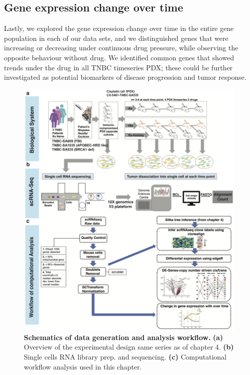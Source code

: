 \subsection{Gene expression change over time}
Lastly, we explored the gene expression change over time in the entire gene population in each of our data sets, and we distinguished genes that were increasing or decreasing under continuous drug pressure, while observing the opposite behaviour without drug. We identified common genes that showed trends under the drug in all TNBC timeseries PDX; these could be further investigated as potential biomarkers of disease progression and tumor response.


\begin{figure}
\centering
\includegraphics[width=\textwidth]{Figures/chap5/RNAworkflow.png}
	
\caption[Schematics of experimental design and analysis workflow]
	{\small
	\textbf{Schematics of data generation and analysis workflow.}
	   \textbf{(a)} Overview of the experimental design same series as of chapter 4.
	    \textbf{(b)} Single cells RNA library prep. and sequencing.
	    \textbf{(c)} Computational workflow analysis used in this chapter.
	}
	\label{fig:chap5RNAworkflow}
\end{figure}


